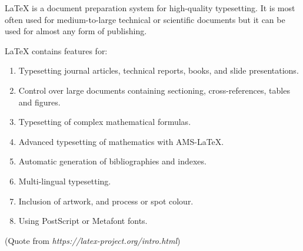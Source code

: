 \begin{eabstract}	%
	LaTeX is a document preparation system for high-quality typesetting. It is most often used for medium-to-large technical or scientific documents but it can be used for almost any form of publishing.
	
  LaTeX contains features for:
\begin{enumerate}
  	\item Typesetting journal articles, technical reports, books, and slide presentations.
  	\item Control over large documents containing sectioning, cross-references, tables and figures.
  	\item Typesetting of complex mathematical formulas.
  	\item Advanced typesetting of mathematics with AMS-LaTeX.
  	\item Automatic generation of bibliographies and indexes.
  	\item Multi-lingual typesetting.
  	\item Inclusion of artwork, and process or spot colour.
  	\item Using PostScript or Metafont fonts.
  \end{enumerate}
  (Quote from \textit{https://latex-project.org/intro.html})  
\end{eabstract}

